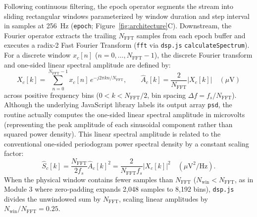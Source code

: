 \documentclass[11pt,letterpaper]{article}
\begin{document}
Following continuous filtering, the epoch operator segments the stream into sliding rectangular windows parameterized by window duration and step interval in samples at 256~Hz (\texttt{epoch}; Figure~\ref{fig:architecture}C). Downstream, the Fourier operator extracts the trailing $N_{\text{FFT}}$ samples from each epoch buffer and executes a radix-2 Fast Fourier Transform (\texttt{fft} via \texttt{dsp.js} \texttt{calculateSpectrum}). For a discrete window $x_c[n]$ ($n = 0, \dots, N_{\text{FFT}}-1$), the discrete Fourier transform and one-sided linear spectral amplitude are defined by:
\begin{equation}
X_c[k] = \sum_{n=0}^{N_{\text{FFT}}-1} x_c[n] \, e^{-j 2\pi k n / N_{\text{FFT}}}, \qquad \hat{A}_c[k] = \frac{2}{N_{\text{FFT}}} \left|X_c[k]\right| \quad (\mu\text{V})
\label{eq:amplitude_spectrum}
\end{equation}
across positive frequency bins ($0 < k < N_{\text{FFT}}/2$, bin spacing $\Delta f = f_s / N_{\text{FFT}}$). Although the underlying JavaScript library labels its output array \texttt{psd}, the routine actually computes the one-sided linear spectral amplitude in microvolts (representing the peak amplitude of each sinusoidal component rather than squared power density). This linear spectral amplitude is related to the conventional one-sided periodogram power spectral density by a constant scaling factor:
\begin{equation}
\hat{S}_c[k] = \frac{N_{\text{FFT}}}{2 f_s} \hat{A}_c[k]^2 = \frac{2}{N_{\text{FFT}} f_s} \left|X_c[k]\right|^2 \quad (\mu\text{V}^2/\text{Hz}).
\label{eq:psd_relation}
\end{equation}
When the physical window contains fewer samples than $N_{\text{FFT}}$ ($N_{\text{win}} < N_{\text{FFT}}$, as in Module 3 where zero-padding expands 2,048 samples to 8,192 bins), \texttt{dsp.js} divides the unwindowed sum by $N_{\text{FFT}}$, scaling linear amplitudes by $N_{\text{win}} / N_{\text{FFT}} = 0.25$.
\end{document}
